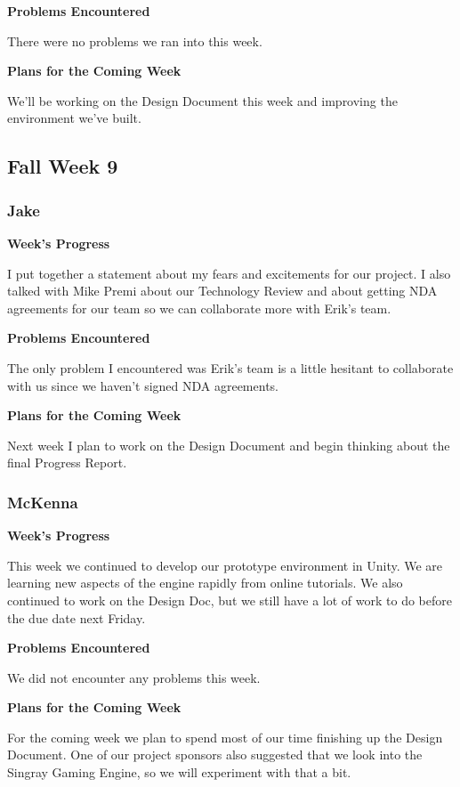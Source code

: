 \documentclass[10pt,journal,compsoc,onecolumn, draftclsnofoot]{IEEEtran}
\begin{document}
\noindent \textbf{Problems Encountered}

There were no problems we ran into this week.

\noindent \textbf{Plans for the Coming Week}

We'll be working on the Design Document this week and improving the environment we've built.

\subsection{Fall Week 9}
\subsubsection{Jake}
\noindent \textbf{Week's Progress}

I put together a statement about my fears and excitements for our project. I also talked with Mike Premi about our Technology Review and about getting NDA agreements for our team so we can collaborate more with Erik's team.

\noindent \textbf{Problems Encountered}

The only problem I encountered was Erik's team is a little hesitant to collaborate with us since we haven't signed NDA agreements.

\noindent \textbf{Plans for the Coming Week}

Next week I plan to work on the Design Document and begin thinking about the final Progress Report.

\subsubsection{McKenna}
\noindent \textbf{Week's Progress}

This week we continued to develop our prototype environment in Unity. We are learning new aspects of the engine rapidly from online tutorials. We also continued to work on the Design Doc, but we still have a lot of work to do before the due date next Friday.

\noindent \textbf{Problems Encountered}

We did not encounter any problems this week.

\noindent \textbf{Plans for the Coming Week}

For the coming week we plan to spend most of our time finishing up the Design Document. One of our project sponsors also suggested that we look into the Singray Gaming Engine, so we will experiment with that a bit.
\end{document}
